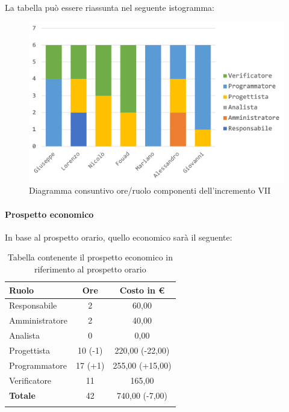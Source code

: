 		La tabella può essere riassunta nel seguente istogramma:
		
		\begin{figure}[H]
			\centering
			\includegraphics[width=0.8\linewidth]{images/consuntivo/ConsIncr7-1.png}
			\caption{Diagramma consuntivo ore/ruolo componenti dell'incremento VII}
			\label{fig:consuntivo diagramma suddivisione ruoli incremento VII}
		\end{figure}
		\pagebreak
		
		\paragraph{Prospetto economico}
		In base al prospetto orario, quello economico sarà il seguente: 
		
		\begin{longtable}{|l|c|c|}
			\hline
			\rowcolor{lighter-grayer}
			\textbf{Ruolo} & \textbf{Ore} & \textbf{Costo in € } \\
			\hline
			\endfirsthead
			
			\hline
			Responsabile 	    & 2 & 60,00\\
			\hline 
			\hline
			Amministratore	   & 2 & 40,00\\
			\hline
			\hline
			Analista 				 & 0 & 0,00\\
			\hline
			\hline
			Progettista 		   & 10 (-1) & 220,00 (-22,00)\\
			\hline
			\hline
			Programmatore 	  & 17 (+1) & 255,00 (+15,00)\\
			\hline
			\hline
			Verificatore 		   & 11 & 165,00\\
			\hline
			\textbf{Totale} 	 & 42 & 740,00 (-7,00)\\
			\hline
			\caption{Tabella contenente il prospetto economico in riferimento al prospetto orario}
		\end{longtable}
	
